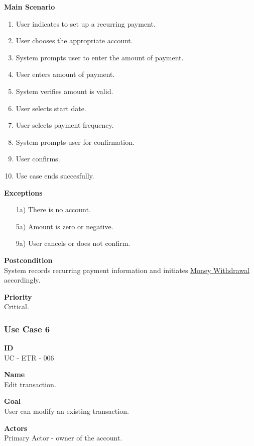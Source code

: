 \documentclass[12pt]{article}
\begin{document}
\noindent
{\bf Main Scenario}\\
\vspace*{-0.2in}
\begin{enumerate}
  \item User indicates to set up a recurring payment.
  \item User chooses the appropriate account.
  \item System prompts user to enter the amount of payment.
  \item User enters amount of payment.
  \item System verifies amount is valid.
  \item User selects start date.
  \item User selects payment frequency.
  \item System prompts user for confirmation.
  \item User confirms.
  \item Use case ends succesfully.
\end{enumerate}

\noindent
    {\bf Exceptions}\\
    \vspace{-0.2in}
    \begin{itemize}
    \item[1a)] There is no account.
    \item[5a)] Amount is zero or negative.
    \item[9a)] User cancels or does not confirm.
    \end{itemize}

\noindent
{\bf Postcondition}\\
System records recurring payment information and initiates \underline{Money Withdrawal} accordingly.

\noindent
{\bf Priority}\\
Critical.

\subsubsection{Use Case 6} \label{uc:6}

\noindent
{\bf ID}\\
UC - ETR - 006

\noindent
{\bf Name}\\
Edit transaction.

\noindent
{\bf Goal}\\
User can modify an existing transaction.

\noindent
{\bf Actors}\\
Primary Actor - owner of the account.
\end{document}
